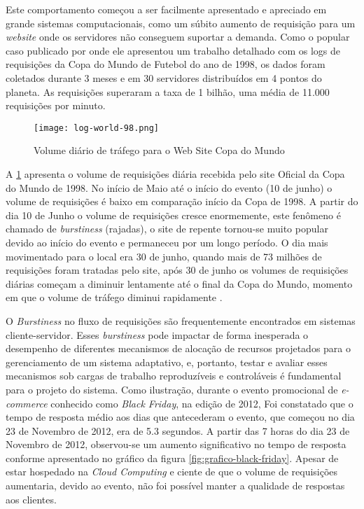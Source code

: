 Este comportamento começou a ser facilmente apresentado e apreciado em grande sistemas computacionais, como um súbito aumento de requisição para um \textit{website} onde os servidores não conseguem suportar a demanda. Como o popular caso publicado por \cite{Arlitt2000} onde ele apresentou um trabalho detalhado com os logs de requisições da Copa do Mundo de Futebol do ano de 1998, os dados foram coletados durante 3 meses e em 30 servidores distribuídos em 4 pontos do planeta. As requisições superaram a taxa de 1 bilhão, uma média de 11.000 requisições por minuto.

\begin{figure}[htb]
	\caption{Volume diário de tráfego para o Web Site Copa do Mundo}
	\label{fig:log98}
	\centering
	\texttt{[image: log-world-98.png]}
\end{figure}

A \ref{fig:log98} apresenta o volume de requisições diária recebida pelo site Oficial da Copa do Mundo de 1998. No início de Maio até o início do evento (10 de junho) o volume de requisições é baixo em comparação início da Copa de 1998. A partir do dia 10 de Junho o volume de requisições cresce enormemente, este fenômeno é chamado de \textit{burstiness} (rajadas), o site de repente tornou-se muito popular devido ao início do evento e permaneceu por um longo período. O dia mais movimentado para o local era 30 de junho, quando mais de 73 milhões de requisições foram tratadas pelo site, após 30 de junho os volumes de requisições diárias começam a diminuir lentamente até o final da Copa do Mundo, momento em que o volume de tráfego diminui rapidamente \cite{Arlitt2000}.

O \textit{Burstiness} no fluxo de requisições são frequentemente encontrados em sistemas cliente-servidor. Esses \textit{burstiness} pode impactar de forma inesperada o desempenho de diferentes mecanismos de alocação de recursos projetados para o gerenciamento de um sistema adaptativo, e, portanto, testar e avaliar esses mecanismos sob cargas de trabalho reproduzíveis e controláveis é fundamental para o projeto do sistema.  Como ilustração, durante o evento promocional de \textit{e-commerce} conhecido como \textit{Black Friday}, na edição de 2012, Foi constatado que o tempo de resposta médio aos dias que antecederam o evento, que começou no dia 23 de Novembro de 2012, era de 5.3 segundos. A partir das 7 horas do dia 23 de Novembro de 2012, observou-se um aumento significativo no tempo de resposta conforme apresentado no gráfico da figura \ref{fig:grafico-black-friday}. Apesar de estar hospedado na \textit{Cloud Computing} e ciente de que o volume de requisições aumentaria, devido ao evento, não foi possível manter a qualidade de respostas aos clientes.

